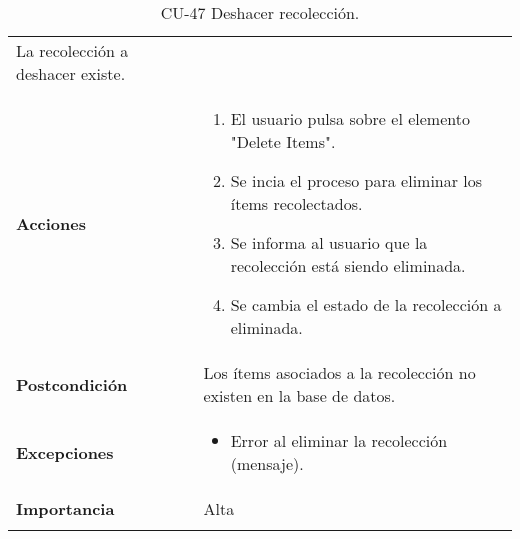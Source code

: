 \begin{longtable}[]{@{}ll@{}}
\begin{minipage}[t]{0.69\columnwidth}
La recolección a deshacer existe.\strut
\end{minipage}\tabularnewline
\begin{minipage}[t]{0.25\columnwidth}\raggedright
\textbf{Acciones}\strut
\end{minipage} & \begin{minipage}[t]{0.69\columnwidth}\raggedright
\begin{enumerate}
\def\labelenumi{\arabic{enumi}.}
\tightlist
\item
  El usuario pulsa sobre el elemento "Delete Items".
\item
  Se incia el proceso para eliminar los ítems recolectados.
\item
  Se informa al usuario que la recolección está siendo eliminada.
\item
  Se cambia el estado de la recolección a eliminada.
\end{enumerate}\strut
\end{minipage}\tabularnewline
\begin{minipage}[t]{0.25\columnwidth}\raggedright
\textbf{Postcondición}\strut
\end{minipage} & \begin{minipage}[t]{0.69\columnwidth}\raggedright
Los ítems asociados a la recolección no existen en la base de
datos.\strut
\end{minipage}\tabularnewline
\begin{minipage}[t]{0.25\columnwidth}\raggedright
\textbf{Excepciones}\strut
\end{minipage} & \begin{minipage}[t]{0.69\columnwidth}\raggedright
\begin{itemize}
\tightlist
\item
  Error al eliminar la recolección (mensaje).
\end{itemize}\strut
\end{minipage}\tabularnewline
\begin{minipage}[t]{0.25\columnwidth}\raggedright
\textbf{Importancia}\strut
\end{minipage} & \begin{minipage}[t]{0.69\columnwidth}\raggedright
Alta\strut
\end{minipage}\tabularnewline
\bottomrule
\caption{CU-47 Deshacer recolección.}
\end{longtable}

